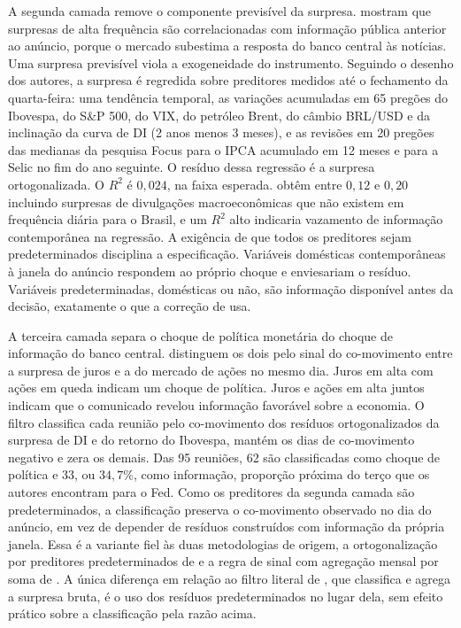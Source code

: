 \documentclass[
article,			%
12pt,				%
oneside,			%
a4paper,			%
hidelinks, 
english,			%
brazil,				%
]{abntex2}
\theoremstyle{plain}
\theoremstyle{definition}
\theoremstyle{remark}
\begin{document}
A segunda camada remove o componente previsível da surpresa.  mostram que surpresas de alta frequência são correlacionadas com informação pública anterior ao anúncio, porque o mercado subestima a resposta do banco central às notícias. Uma surpresa previsível viola a exogeneidade do instrumento. Seguindo o desenho dos autores, a surpresa é regredida sobre preditores medidos até o fechamento da quarta-feira: uma tendência temporal, as variações acumuladas em 65 pregões do Ibovespa, do S\&P 500, do VIX, do petróleo Brent, do câmbio BRL/USD e da inclinação da curva de DI (2 anos menos 3 meses), e as revisões em 20 pregões das medianas da pesquisa Focus para o IPCA acumulado em 12 meses e para a Selic no fim do ano seguinte. O resíduo dessa regressão é a surpresa ortogonalizada. O $R^2$ é $0{,}024$, na faixa esperada.  obtêm entre $0{,}12$ e $0{,}20$ incluindo surpresas de divulgações macroeconômicas que não existem em frequência diária para o Brasil, e um $R^2$ alto indicaria vazamento de informação contemporânea na regressão. A exigência de que todos os preditores sejam predeterminados disciplina a especificação. Variáveis domésticas contemporâneas à janela do anúncio respondem ao próprio choque e enviesariam o resíduo. Variáveis predeterminadas, domésticas ou não, são informação disponível antes da decisão, exatamente o que a correção de  usa.

A terceira camada separa o choque de política monetária do choque de informação do banco central.  distinguem os dois pelo sinal do co-movimento entre a surpresa de juros e a do mercado de ações no mesmo dia. Juros em alta com ações em queda indicam um choque de política. Juros e ações em alta juntos indicam que o comunicado revelou informação favorável sobre a economia. O filtro classifica cada reunião pelo co-movimento dos resíduos ortogonalizados da surpresa de DI e do retorno do Ibovespa, mantém os dias de co-movimento negativo e zera os demais. Das 95 reuniões, 62 são classificadas como choque de política e 33, ou $34{,}7\%$, como informação, proporção próxima do terço que os autores encontram para o Fed. Como os preditores da segunda camada são predeterminados, a classificação preserva o co-movimento observado no dia do anúncio, em vez de depender de resíduos construídos com informação da própria janela. Essa é a variante fiel às duas metodologias de origem, a ortogonalização por preditores predeterminados de  e a regra de sinal com agregação mensal por soma de . A única diferença em relação ao filtro literal de , que classifica e agrega a surpresa bruta, é o uso dos resíduos predeterminados no lugar dela, sem efeito prático sobre a classificação pela razão acima. 
\end{document}
